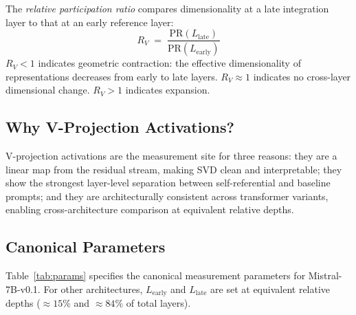 \documentclass{article}
\newcommand{\RV}{R_V}
\newcommand{\PR}{\text{PR}}
\begin{document}
The \emph{relative participation ratio} compares dimensionality at a late integration layer to that
at an early reference layer:
\begin{equation}
    \RV \;=\; \frac{\PR(L_\mathrm{late})}{\PR(L_\mathrm{early})}
    \label{eq:rv}
\end{equation}
$\RV < 1$ indicates geometric contraction: the effective dimensionality of representations decreases
from early to late layers.
$\RV \approx 1$ indicates no cross-layer dimensional change.
$\RV > 1$ indicates expansion.

\subsection{Why V-Projection Activations?}

V-projection activations are the measurement site for three reasons:
they are a linear map from the residual stream, making SVD clean and interpretable;
they show the strongest layer-level separation between self-referential and baseline prompts;
and they are architecturally consistent across transformer variants, enabling cross-architecture
comparison at equivalent relative depths.

\subsection{Canonical Parameters}

Table~\ref{tab:params} specifies the canonical measurement parameters for Mistral-7B-v0.1.
For other architectures, $L_\mathrm{early}$ and $L_\mathrm{late}$ are set at equivalent relative
depths (${\approx}15\%$ and ${\approx}84\%$ of total layers).
\end{document}
